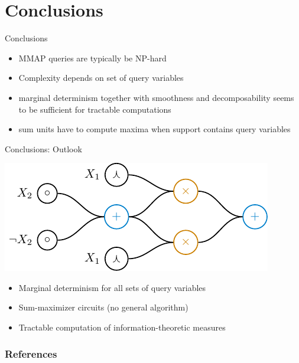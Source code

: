 \documentclass[aspectratio=169]{beamer}
\begin{document}
\section{Conclusions}
  \begin{frame}{Conclusions}
    \begin{itemize}
      \item<+-> MMAP queries are typically be NP-hard
      \item<+-> Complexity depends on set of query variables
      \item<+-> marginal determinism together with smoothness and decomposability seems to be sufficient for tractable computations
      \item<+-> sum units have to compute maxima when support contains query variables
    \end{itemize}
  \end{frame}

  \begin{frame}{Conclusions: Outlook}
    \vspace{1em}
    \onslide<+->
    \begin{minipage}[c]{0.49\textwidth}
      \center
      \includegraphics[width=\textwidth]{figures/example.pdf}
    \end{minipage}
    \begin{minipage}[c]{0.49\textwidth}
      \begin{itemize}
        \item<+-> Marginal determinism for all sets of query variables
        \item<+-> Sum-maximizer circuits (no general algorithm)
        \item<+-> Tractable computation of information-theoretic measures
      \end{itemize}
    \end{minipage}
  \end{frame}

\setcounter{backupcounter}{\value{framenumber}}

\begin{frame}[plain]
  \frametitle{References}
    \nocite{*}
    \printbibliography
\end{frame}

\setcounter{framenumber}{\value{backupcounter}}
\end{document}
